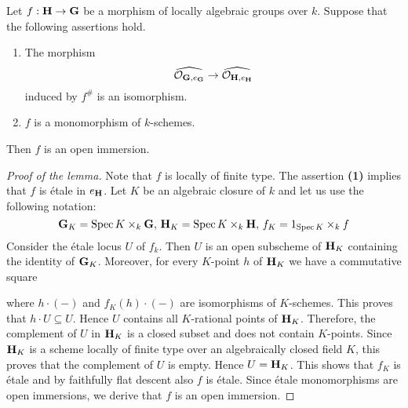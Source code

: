 \begin{lemma}\label{lemma:infinitesimal_isomorphisms}
Let $f:\mathbf{H}\rightarrow \mathbf{G}$ be a morphism of locally algebraic groups over $k$. Suppose that the following assertions hold.
\begin{enumerate}[label=\emph{\textbf{(\arabic*)}}, leftmargin=3.0em]
\item The morphism
$$\widehat{{\mathcal O}_{\mathbf{G},e_{\mathbf{G}}}} \rightarrow  \widehat{{\mathcal O}_{\mathbf{H},e_{\mathbf{H}}}}$$
induced by $f^{\#}$ is an isomorphism.
\item $f$ is a monomorphism of $k$-schemes.
\end{enumerate}
Then $f$ is an open immersion.
\end{lemma}
\begin{proof}[Proof of the lemma]
Note that $f$ is locally of finite type. The assertion \textbf{(1)} implies that $f$ is {\'e}tale in $e_{\mathbf{H}}$. Let $K$ be an algebraic closure of $k$ and let us use the following notation:
$$\mathbf{G}_K = \mathrm{Spec}\, K\times_k\mathbf{G},\,\mathbf{H}_K = \mathrm{Spec}\, K\times_k \mathbf{H},\,f_K = 1_{\mathrm{Spec}\, K}\times_kf$$
Consider the {\'e}tale locus $U$ of $f_k$. Then $U$ is an open subscheme of $\mathbf{H}_K$ containing the identity of $\mathbf{G}_K$. Moreover, for every $K$-point $h$ of $\mathbf{H}_K$ we have a commutative square
\begin{center}
\end{center}
where $h\cdot (-)$ and $f_K(h)\cdot (-)$ are isomorphisms of $K$-schemes. This proves that $h\cdot U\subseteq U$. Hence $U$ contains all $K$-rational points of $\mathbf{H}_K$. Therefore, the complement of $U$ in $\mathbf{H}_K$ is a closed subset and does not contain $K$-points. Since $\mathbf{H}_K$ is a scheme locally of finite type over an algebraically closed field $K$, this proves that the complement of $U$ is empty. Hence $U = \mathbf{H}_K$. This shows that $f_K$ is {\'e}tale and by faithfully flat descent also $f$ is {\'e}tale. Since {\'e}tale monomorphisms are open immersions, we derive that $f$ is an open immersion.
\end{proof}

